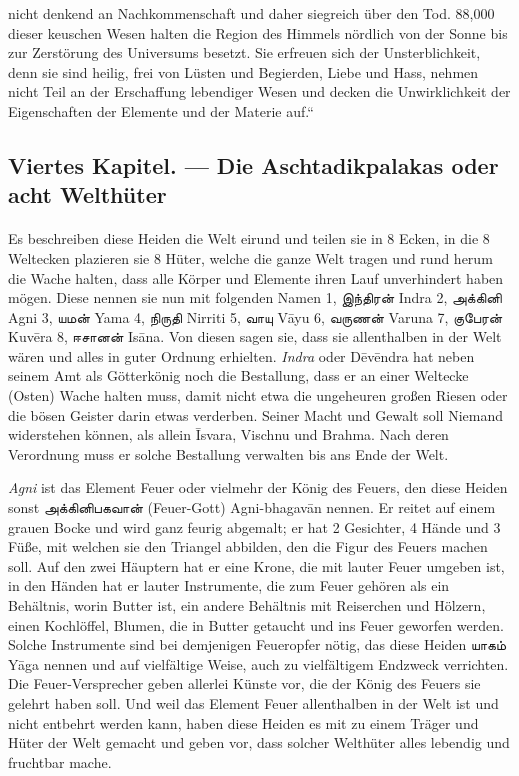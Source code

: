 \documentclass{article}
\newcommand{\TamilText}[1]{\texttamil{#1}}
\newcommand{\tam}[1]{\TamilText{#1}}
\begin{document}
nicht denkend an Nachkommenschaft und daher siegreich über den Tod. 88,000 dieser keuschen Wesen halten die Region des Himmels nördlich von der Sonne bis zur Zerstörung des Universums besetzt. Sie erfreuen sich der Unsterblichkeit, denn sie sind heilig, frei von Lüsten und Begierden, Liebe und Hass, nehmen nicht Teil an der Erschaffung lebendiger Wesen und decken die Unwirklichkeit der Eigenschaften der Elemente und der Materie auf.“

\clearpage
\subsection{Viertes Kapitel. — Die Aschtadikpalakas oder acht Welthüter}
\paragraph{}
Es beschreiben diese Heiden die Welt eirund und teilen sie in 8 Ecken, in die 8 Weltecken plazieren sie 8 Hüter, welche die ganze Welt tragen und rund herum die Wache halten, dass alle Körper und Elemente ihren Lauf unverhindert haben mögen. Diese nennen sie nun mit folgenden Namen 1, \tam{இந்திரன்} Indra 2, \tam{அக்கினி} Agni 3, \tam{யமன்} Yama 4, \tam{நிருதி} Nirriti 5, \tam{வாயு} V\={a}yu 6, \tam{வருணன்} Varuna 7, \tam{குபேரன்} Kuv\={e}ra 8, \tam{ஈசானன்} Is\={a}na. Von diesen sagen sie, dass sie allenthalben in der Welt wären und alles in guter Ordnung erhielten. \emph{Indra} oder D\={e}v\={e}ndra hat neben seinem Amt als Götterkönig noch die Bestallung, dass er an einer Weltecke (Osten) Wache halten muss, damit nicht etwa die ungeheuren großen Riesen oder die bösen Geister darin etwas verderben. Seiner Macht und Gewalt soll Niemand widerstehen können, als allein \={I}svara, Vischnu und Brahma. Nach deren Verordnung muss er solche Bestallung verwalten bis ans Ende der Welt.

\emph{Agni} ist das Element Feuer oder vielmehr der König des Feuers, den diese Heiden sonst \tam{அக்கினிபகவான்} (Feuer-Gott) Agni-bhagav\={a}n nennen. Er reitet auf einem grauen Bocke und wird ganz feurig abgemalt; er hat 2 Gesichter, 4 Hände und 3 Füße, mit welchen sie den Triangel abbilden, den die Figur des Feuers machen soll. Auf den zwei Häuptern hat er eine Krone, die mit lauter Feuer umgeben ist, in den Händen hat er lauter Instrumente, die zum Feuer gehören als ein Behältnis, worin Butter ist, ein andere Behältnis mit Reiserchen und Hölzern, einen Kochlöffel, Blumen, die in Butter getaucht und ins Feuer geworfen werden. Solche Instrumente sind bei demjenigen Feueropfer nötig, das diese Heiden \tam{யாகம்} Y\={a}ga nennen und auf vielfältige Weise, auch zu vielfältigem Endzweck verrichten. Die Feuer-Versprecher geben allerlei Künste vor, die der König des Feuers sie gelehrt haben soll. Und weil das Element Feuer allenthalben in der Welt ist und nicht entbehrt werden kann, haben diese Heiden es mit zu einem Träger und Hüter der Welt gemacht und geben vor, dass solcher Welthüter alles lebendig und fruchtbar mache.
\end{document}
